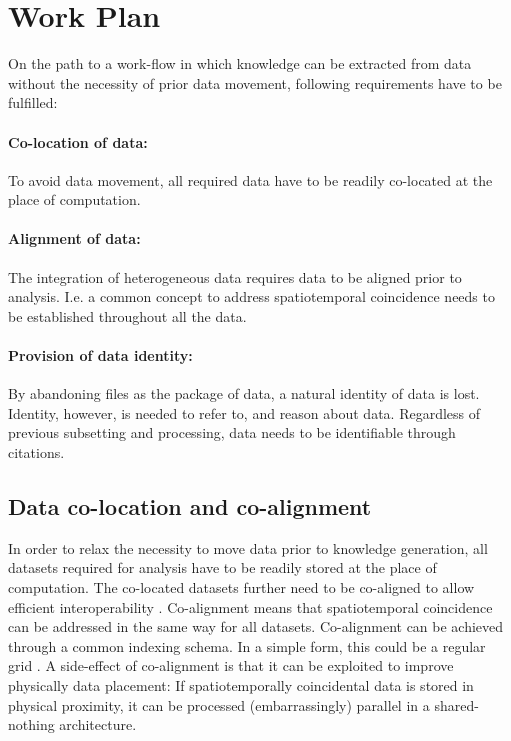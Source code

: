 \documentclass[a4paper,10pt]{article}
\begin{document}
\newpage

\section{Work Plan}
On the path to a work-flow in which knowledge can be extracted from data without the necessity of prior data movement, following requirements have to be fulfilled:

\paragraph{Co-location of data:}
To avoid data movement, all required data have to be readily co-located at the place of computation. 

\paragraph{Alignment of data:}
The integration of heterogeneous data requires data to be aligned prior to analysis. I.e. a common concept to address spatiotemporal coincidence needs to be established throughout all the data.

\paragraph{Provision of data identity:}
By abandoning files as the package of data, a natural identity of data is lost. Identity, however, is needed to refer to, and reason about data. Regardless of previous subsetting and processing, data needs to be identifiable through citations.

\subsection{Data co-location and co-alignment}
In order to relax the necessity to move data prior to knowledge generation, all datasets required for analysis have to be readily stored at the place of computation. 
The co-located datasets further need to be co-aligned to allow efficient interoperability \citep{Kuo2017, Rilee2016}. 
Co-alignment means that spatiotemporal coincidence can be addressed in the same way for all datasets. 
Co-alignment can be achieved through a common indexing schema. 
In a simple form, this could be a regular grid . 
A side-effect of co-alignment is that it can be exploited to improve physically data placement: If spatiotemporally coincidental data is stored in physical proximity, it can be processed (embarrassingly) parallel in a shared-nothing architecture\citep{Kuo2017}.
\end{document}
